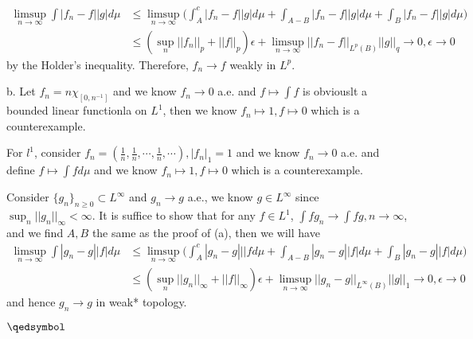 \documentclass[lang=en,11pt,a4paper,citestyle =authoryear]{elegantpaper}
\newcommand{\prvd}{$\hfill \qedsymbol$}
\begin{document}
\[\begin{aligned}
\limsup_{n\to\infty} \int |f_n-f||g|d\mu &\leq \limsup_{n\to\infty} \Big(\int_A^c |f_n-f||g|d\mu + \int_{A-B} |f_n-f||g|d\mu + \int_B |f_n-f||g|d\mu\Big) \\ &\leq (\sup_n||f_n||_p+||f||_p)\epsilon + \limsup_{n\to\infty}||f_n-f||_{L^p(B)}||g||_q \to 0, \epsilon \to 0
\end{aligned}\] 
by the Holder's inequality. Therefore, $f_n\to f$ weakly in $L^p$.\par
b. Let $f_n = n\chi_{[0,n^{-1}]}$ and we know $f_n \to 0$ a.e. and $f\mapsto \int f$ is obviouslt a bounded linear functionla on $L^1$, then we know $f_n\mapsto 1, f\mapsto 0$ which is a counterexample.\par
For $l^1$, consider $f_n = (\tfrac{1}{n},\tfrac{1}{n},\cdots,\tfrac{1}{n},\cdots), |f_n|_1 = 1$ and we know $f_n\to 0$ a.e. and define $f\mapsto \int f d\mu$ and we know $f_n\mapsto 1, f\mapsto 0$ which is a counterexample.\par
Consider $\{g_n\}_{n\geq 0}\subset L^{\infty}$ and $g_n\to g$ a.e., we know $g\in L^{\infty}$ since $\sup_n ||g_n||_{\infty} < \infty$. It is suffice to show that for any $f\in L^1$, $\int fg_n \to \int fg, n\to\infty$, and we find $A,B$ the same as the proof of (a), then we will have
\[\begin{aligned}
\limsup_{n\to\infty} \int |g_n-g||f|d\mu &\leq \limsup_{n\to\infty} \Big(\int_A^c |g_n-g|||fd\mu + \int_{A-B} |g_n-g||f|d\mu + \int_B |g_n-g||f|d\mu\Big) \\ &\leq (\sup_n||g_n||_{\infty}+||f||_{\infty})\epsilon + \limsup_{n\to\infty}||g_n-g||_{L^{\infty}(B)}||g||_1 \to 0, \epsilon \to 0
\end{aligned}\] 
and hence $g_n\to g$ in weak* topology.\par
\prvd
\vspace{0.5em}

\addappheadtotoc
\end{document}
